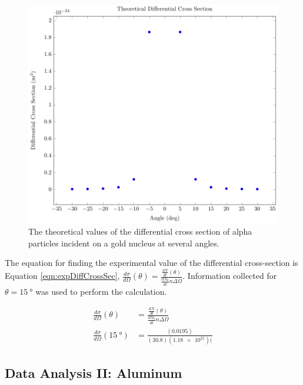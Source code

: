 \documentclass[a4paper]{article}
\begin{document}
\begin{figure}[H]
  \begin{center}
    \includegraphics[scale=0.8]{Plots/TheoreticalCrossSectionalArea/theoCrossSec.pdf}
  \end{center}
  \caption{The theoretical values of the differential cross section of
    alpha particles incident on a gold nucleus at several angles.}
  \label{gph:theoCrossSecAu}
\end{figure}
  
\qq The equation for finding the experimental value of the differential
cross-section is Equation \ref{eqn:expDiffCrossSec}, \( \frac{d\sigma}{d\Omega}
(\theta) = \frac{\frac{dN}{dt} (\theta)}{\frac{dN_0}{dt} n \Delta \Omega}
\). Information collected for \( \theta = \SI{15}{\degree} \) was used to
perform the calculation.

\begin{align*}
  \frac{d\sigma}{d\Omega} (\theta) &= \frac{\frac{dN}{dt}
                                     (\theta)}{\frac{dN_0}{dt} n \Delta \Omega}
  \\
  \frac{d\sigma}{d\Omega} (\SI{15}{\degree}) 
   &= \frac{(\num{0.0195})}{(30.8) (\num{1.18e21}) (}
\end{align*}

\subsection{Data Analysis II: Aluminum}
\end{document}
